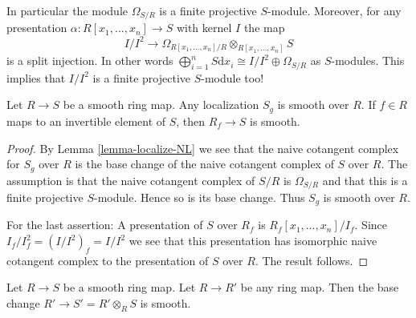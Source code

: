 \noindent
In particular the module $\Omega_{S/R}$ is a finite projective
$S$-module. Moreover, for any presentation
$\alpha : R[x_1, \ldots, x_n] \to S$ with kernel $I$
the map
$$
I/I^2
\longrightarrow
\Omega_{R[x_1, \ldots, x_n]/R} \otimes_{R[x_1, \ldots, x_n]} S
$$
is a split injection. In other words
$\bigoplus_{i = 1}^n S \text{d}x_i \cong I/I^2 \oplus \Omega_{S/R}$
as $S$-modules. This implies that $I/I^2$ is a finite projective
$S$-module too!

\begin{lemma}
\label{lemma-localize-smooth}
Let $R \to S$ be a smooth ring map.
Any localization $S_g$ is smooth over $R$.
If $f \in R$ maps to an invertible element of $S$,
then $R_f \to S$ is smooth.
\end{lemma}

\begin{proof}
By Lemma \ref{lemma-localize-NL} we see that the naive cotangent
complex for $S_g$ over $R$ is the base change of the naive cotangent
complex of $S$ over $R$. The assumption is that the naive cotangent
complex of $S/R$ is $\Omega_{S/R}$ and that this is a finite projective
$S$-module. Hence so is its base change. Thus $S_g$ is smooth over $R$.

\medskip\noindent
For the last assertion: A presentation of $S$ over
$R_f$ is $R_f[x_1, \ldots, x_n]/I_f$. Since $I_f/I_f^2
= (I/I^2)_f = I/I^2$ we see that this presentation
has isomorphic naive cotangent complex to the presentation
of $S$ over $R$. The result follows.
\end{proof}

\begin{lemma}
\label{lemma-base-change-smooth}
Let $R \to S$ be a smooth ring map.
Let $R \to R'$ be any ring map.
Then the base change $R' \to S' = R' \otimes_R S$ is smooth.
\end{lemma}

